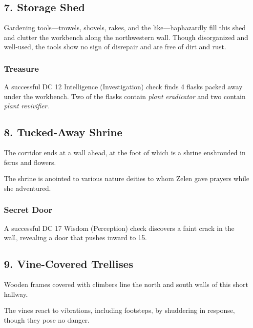 \documentclass[10pt,a4paper,twoside,bg=print,twocolumn,openany,nodeprecatedcode]{dndbook}
\begin{document}
\subsection{7. Storage Shed}
\begin{DndReadAloud}{}
Gardening tools—trowels, shovels, rakes, and the like—haphazardly fill this shed and clutter the workbench along the northwestern wall. Though disorganized and well-used, the tools show no sign of disrepair and are free of dirt and rust.

\end{DndReadAloud}

\subsubsection{Treasure}
A successful DC 12 Intelligence (Investigation) check finds 4 flasks packed away under the workbench. Two of the flasks contain \textit{plant eradicator} and two contain \textit{plant revivifier}.

\subsection{8. Tucked-Away Shrine}
\begin{DndReadAloud}{}
The corridor ends at a wall ahead, at the foot of which is a shrine enshrouded in ferns and flowers.

\end{DndReadAloud}

The shrine is anointed to various nature deities to whom Zelen gave prayers while she adventured.

\subsubsection{Secret Door}
A successful DC 17 Wisdom (Perception) check discovers a faint crack in the wall, revealing a door that pushes inward to 15.

\subsection{9. Vine-Covered Trellises}
\begin{DndReadAloud}{}
Wooden frames covered with climbers line the north and south walls of this short hallway.

\end{DndReadAloud}

The vines react to vibrations, including footsteps, by shuddering in response, though they pose no danger.
\end{document}
